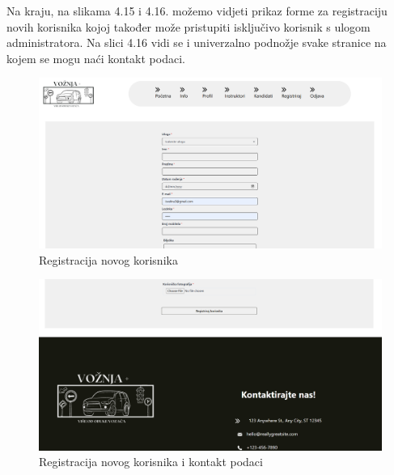 \noindent Na kraju, na slikama 4.15 i 4.16. možemo vidjeti prikaz forme za registraciju novih korisnika kojoj također može pristupiti isključivo korisnik s ulogom administratora. Na slici 4.16 vidi se i univerzalno podnožje svake stranice na kojem se mogu naći kontakt podaci.

\begin{figure}[H]
					\includegraphics[width=\textwidth]{slike/admin2.png} 
					\centering
					\caption{Registracija novog korisnika}
					\label{fig:promjene}
				\end{figure}

    
\begin{figure}[H]
					\includegraphics[width=\textwidth]{slike/admin3.png} 
					\centering
					\caption{Registracija novog korisnika i kontakt podaci}
					\label{fig:promjene}
				\end{figure}